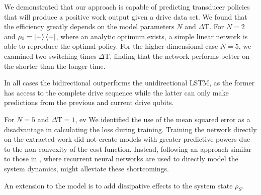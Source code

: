 We demonstrated that our approach is capable of predicting transducer policies that will produce a positive work output given a drive data set.
We found that the efficiency greatly depends on the model parameters $N$ and $\Delta \mathrm{T}$.
For $N=2$ and $\rho_0 = \ket{+}\bra{+}$, where an analytic optimum exists, a simple linear network is able to reproduce the optimal policy.
For the higher-dimensional case $N=5$, we examined two switching times $\Delta \mathrm{T}$, finding that the network performs better on the shorter than the longer time.


In all cases the bidirectional outperforms the unidirectional LSTM, as the former has access to the complete drive sequence while the latter can only make predictions from the previous and current drive qubits.

For $N=5$ and $\Delta \mathrm{T}=1$, ev
We identified the use of the mean squared error as a disadvantage in calculating the loss during training.
Training the network directly on the extracted work did not create models with greater predictive powers due to the non-convexity of the cost function.
Instead, following an approach similar to those in \cite{Banchi_2018, PhysRevX.10.011006}, where recurrent neural networks are used to directly model the system dynamics, might alleviate these shortcomings.

An extension to the model is to add dissipative effects to the system state $\rho_S$.